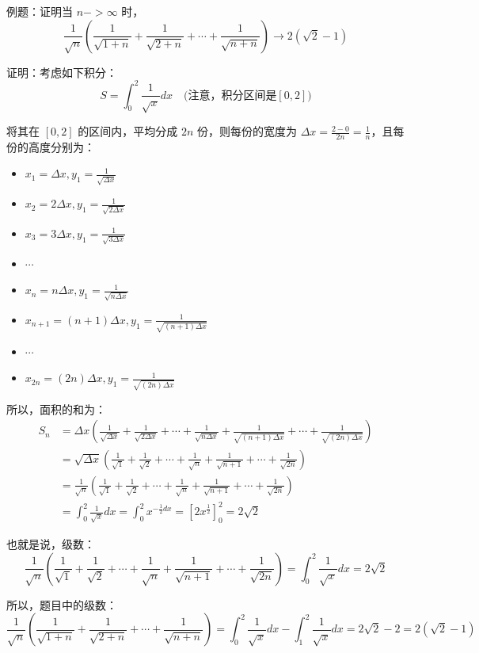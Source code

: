 \documentclass[12pt]{article}
\begin{document}
\begin{framed}  
\small{
例题：证明当 $n->\infty$ 时，
$$
\frac{1}{\sqrt{n}}(\frac{1}{\sqrt{1+n}} + \frac{1}{\sqrt{2+n}} + \cdots + \frac{1}{\sqrt{n+n}}) \rightarrow 2(\sqrt{2} - 1)
$$

证明：考虑如下积分：
$$
S = \int_0^2\frac{1}{\sqrt{x}}dx \quad \text{(注意，积分区间是} [0,2])
$$

将其在 $[0,2]$ 的区间内，平均分成 $2n$ 份，则每份的宽度为 $\Delta x = \frac{2-0}{2n} = \frac{1}{n}$，且每份的高度分别为：
\begin{itemize}
    \item $x_1 = \Delta x, y_1 = \frac{1}{\sqrt{\Delta x}}$
    \item $x_2 = 2\Delta x, y_1 = \frac{1}{\sqrt{2\Delta x}}$
    \item $x_3 = 3\Delta x, y_1 = \frac{1}{\sqrt{3\Delta x}}$
    \item $\cdots$
    \item $x_n = n\Delta x, y_1 = \frac{1}{\sqrt{n\Delta x}}$
    \item $x_{n+1} = (n+1)\Delta x, y_1 = \frac{1}{\sqrt{(n+1)\Delta x}}$
    \item $\cdots$
    \item $x_{2n} = (2n)\Delta x, y_1 = \frac{1}{\sqrt{(2n)\Delta x}}$
\end{itemize}

所以，面积的和为：
\begin{align}
   S_n &= \Delta x(\frac{1}{\sqrt{\Delta x}} + \frac{1}{\sqrt{2\Delta x}} + \cdots + \frac{1}{\sqrt{n\Delta x}} + \frac{1}{\sqrt{(n+1)\Delta x}} + \cdots + \frac{1}{\sqrt{(2n)\Delta x}}) \\
   &= \sqrt{\Delta x}(\frac{1}{\sqrt{1}} + \frac{1}{\sqrt{2}} + \cdots + \frac{1}{\sqrt{n}} + \frac{1}{\sqrt{n+1}} + \cdots + \frac{1}{\sqrt{2n}}) \\
   &= \frac{1}{\sqrt{n}}(\frac{1}{\sqrt{1}} + \frac{1}{\sqrt{2}} + \cdots + \frac{1}{\sqrt{n}} + \frac{1}{\sqrt{n+1}} + \cdots + \frac{1}{\sqrt{2n}}) \\
   &= \int_0^2\frac{1}{\sqrt{x}}dx = \int_0^2x^{-\frac{1}{2}dx} = [2x^{\frac{1}{2}}]_0^2 = 2\sqrt{2}
\end{align}

也就是说，级数：
$$
\frac{1}{\sqrt{n}}(\frac{1}{\sqrt{1}} + \frac{1}{\sqrt{2}} + \cdots + \frac{1}{\sqrt{n}} + \frac{1}{\sqrt{n+1}} + \cdots + \frac{1}{\sqrt{2n}}) = \int_0^2\frac{1}{\sqrt{x}}dx = 2\sqrt{2}
$$

所以，题目中的级数：
$$
\frac{1}{\sqrt{n}}(\frac{1}{\sqrt{1+n}} + \frac{1}{\sqrt{2+n}} + \cdots + \frac{1}{\sqrt{n+n}}) = \int_0^2\frac{1}{\sqrt{x}}dx - \int_1^2\frac{1}{\sqrt{x}}dx
= 2\sqrt{2} - 2 = 2(\sqrt{2} - 1)
$$
}
\end{framed}



\end{document}
